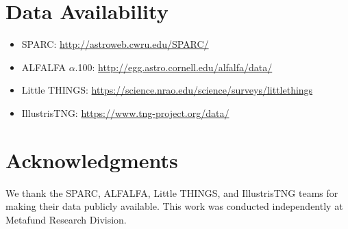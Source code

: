 \documentclass[12pt,a4paper]{article}
\begin{document}
\section*{Data Availability}

\begin{itemize}
    \item SPARC: \url{http://astroweb.cwru.edu/SPARC/}
    \item ALFALFA $\alpha$.100: \url{http://egg.astro.cornell.edu/alfalfa/data/}
    \item Little THINGS: \url{https://science.nrao.edu/science/surveys/littlethings}
    \item IllustrisTNG: \url{https://www.tng-project.org/data/}
\end{itemize}

\section*{Acknowledgments}

We thank the SPARC, ALFALFA, Little THINGS, and IllustrisTNG teams for making their data publicly available. This work was conducted independently at Metafund Research Division.



\end{document}
